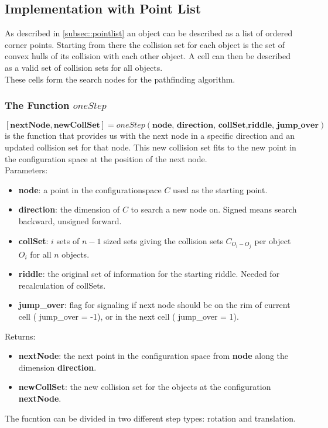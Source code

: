 \subsection{Implementation with Point List}
As described in \ref{subsec::pointlist} an object can be described as a list of ordered corner points. Starting from there the collision set for each object is the set of convex hulls of its collision with each other object. A cell can then be described as a valid set of collision sets for all objects.\\
These cells form the search nodes for the pathfinding algorithm.
\subsubsection{The Function $oneStep$}
$[\textbf{nextNode}, \textbf{newCollSet} ]=oneStep(\textbf{node, direction, collSet,riddle, jump\_over})$ is the function that provides us with the next node in a specific direction and an updated collision set for that node. This new collision set fits to the new point in the configuration space at the position of the next node.\\
Parameters:
\begin{itemize}
\item \textbf{node}: a point in the configurationspace $C$ used as the starting point.
\item \textbf{direction}: the dimension of $C$ to search a new node on. Signed means search backward, unsigned forward. 
\item \textbf{collSet}: $i$ sets of $n-1$ sized sets giving the collision sets $C_{O_i-O_j}$ per object $O_i$ for all $n$ objects.
\item \textbf{riddle}: the original set of information for the starting riddle. Needed for recalculation of collSets.
\item \textbf{jump\_over}: flag for signaling if next node should be on the rim of current cell ( jump\_over = -1), or in the next cell ( jump\_over = 1).
\end{itemize}
Returns:
\begin{itemize}
\item \textbf{nextNode}: the next point in the configuration space from \textbf{node} along the dimension \textbf{direction}.
\item \textbf{newCollSet}: the new collision set for the objects at the configuration \textbf{nextNode}.
\end{itemize}
The fucntion can be divided in two different step types: rotation and translation. \\
